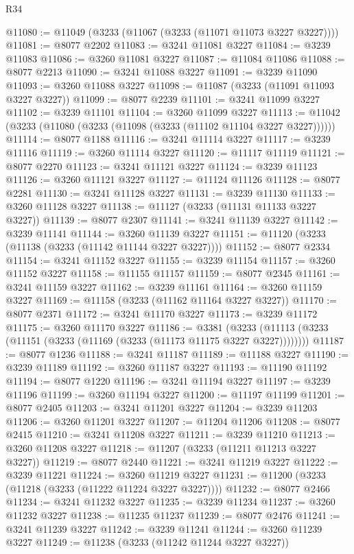 \begin{lexlean}{R34}
\begin{coremodule}
@11080 := @11049 (@3233 (@11067 (@3233 (@11071 @11073 @3227 @3227))))
@11081 := @8077 @2202
@11083 := @3241 @11081 @3227
@11084 := @3239 @11083
@11086 := @3260 @11081 @3227
@11087 := @11084 @11086
@11088 := @8077 @2213
@11090 := @3241 @11088 @3227
@11091 := @3239 @11090
@11093 := @3260 @11088 @3227
@11098 := @11087 (@3233 (@11091 @11093 @3227 @3227))
@11099 := @8077 @2239
@11101 := @3241 @11099 @3227
@11102 := @3239 @11101
@11104 := @3260 @11099 @3227
@11113 := @11042 (@3233 (@11080 (@3233 (@11098 (@3233 (@11102 @11104 @3227 @3227))))))
@11114 := @8077 @1188
@11116 := @3241 @11114 @3227
@11117 := @3239 @11116
@11119 := @3260 @11114 @3227
@11120 := @11117 @11119
@11121 := @8077 @2270
@11123 := @3241 @11121 @3227
@11124 := @3239 @11123
@11126 := @3260 @11121 @3227
@11127 := @11124 @11126
@11128 := @8077 @2281
@11130 := @3241 @11128 @3227
@11131 := @3239 @11130
@11133 := @3260 @11128 @3227
@11138 := @11127 (@3233 (@11131 @11133 @3227 @3227))
@11139 := @8077 @2307
@11141 := @3241 @11139 @3227
@11142 := @3239 @11141
@11144 := @3260 @11139 @3227
@11151 := @11120 (@3233 (@11138 (@3233 (@11142 @11144 @3227 @3227))))
@11152 := @8077 @2334
@11154 := @3241 @11152 @3227
@11155 := @3239 @11154
@11157 := @3260 @11152 @3227
@11158 := @11155 @11157
@11159 := @8077 @2345
@11161 := @3241 @11159 @3227
@11162 := @3239 @11161
@11164 := @3260 @11159 @3227
@11169 := @11158 (@3233 (@11162 @11164 @3227 @3227))
@11170 := @8077 @2371
@11172 := @3241 @11170 @3227
@11173 := @3239 @11172
@11175 := @3260 @11170 @3227
@11186 := @3381
    (@3233 (@11113 (@3233 (@11151 (@3233 (@11169 (@3233 (@11173 @11175 @3227 @3227))))))))
@11187 := @8077 @1236
@11188 := @3241 @11187
@11189 := @11188 @3227
@11190 := @3239 @11189
@11192 := @3260 @11187 @3227
@11193 := @11190 @11192
@11194 := @8077 @1220
@11196 := @3241 @11194 @3227
@11197 := @3239 @11196
@11199 := @3260 @11194 @3227
@11200 := @11197 @11199
@11201 := @8077 @2405
@11203 := @3241 @11201 @3227
@11204 := @3239 @11203
@11206 := @3260 @11201 @3227
@11207 := @11204 @11206
@11208 := @8077 @2415
@11210 := @3241 @11208 @3227
@11211 := @3239 @11210
@11213 := @3260 @11208 @3227
@11218 := @11207 (@3233 (@11211 @11213 @3227 @3227))
@11219 := @8077 @2440
@11221 := @3241 @11219 @3227
@11222 := @3239 @11221
@11224 := @3260 @11219 @3227
@11231 := @11200 (@3233 (@11218 (@3233 (@11222 @11224 @3227 @3227))))
@11232 := @8077 @2466
@11234 := @3241 @11232 @3227
@11235 := @3239 @11234
@11237 := @3260 @11232 @3227
@11238 := @11235 @11237
@11239 := @8077 @2476
@11241 := @3241 @11239 @3227
@11242 := @3239 @11241
@11244 := @3260 @11239 @3227
@11249 := @11238 (@3233 (@11242 @11244 @3227 @3227))

\end{coremodule}
\end{lexlean}
